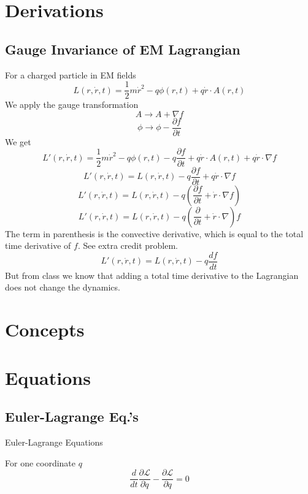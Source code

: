 \documentclass[25pt]{book}
\begin{document}
	\section{Derivations}
	
	\subsection{Gauge Invariance of EM Lagrangian}
	
	For a charged particle in EM fields
	\[
	L(r,\dot{r},t) = \frac{1}{2} m \dot{r}^2 - q \phi(r, t) + q \dot{r} \cdot A(r,t)
	\]
	We apply the gauge transformation 
	\[
	A \rightarrow A + \nabla f
	\]
	\[
	\phi \rightarrow \phi - \frac{\partial f}{\partial t}
	\]
	We get
	\[
	L'(r,\dot{r},t) = \frac{1}{2} m \dot{r}^2 - q \phi(r, t) - q \frac{\partial f}{\partial t} + q \dot{r} \cdot A(r,t) + q \dot{r} \cdot \nabla f
	\]
	\[
	L'(r,\dot{r},t) = L(r,\dot{r},t)  - q \frac{\partial f}{\partial t}  + q \dot{r} \cdot \nabla f
	\]
	\[
	L'(r,\dot{r},t) = L(r,\dot{r},t)  - q \left(  \frac{\partial f}{\partial t}  +  \dot{r} \cdot \nabla f \right)
	\]
	\[
	L'(r,\dot{r},t) = L(r,\dot{r},t)  - q \left(  \frac{\partial }{\partial t}  +  \dot{r} \cdot \nabla \right)f
	\]
	The term in parenthesis is the convective derivative, which is equal to the total time derivative of $f$. See extra credit problem.
	\[
	L'(r,\dot{r},t) = L(r,\dot{r},t)  - q \frac{df}{dt}
	\]
	But from class we know that adding a total time derivative to the Lagrangian does not change the dynamics. 

	
	\section{Concepts}
	
	\section{Equations}
	

	
	
	
	\subsection{Euler-Lagrange Eq.'s}
	
	Euler-Lagrange Equations
	
	For one coordinate $q$
	\[
	\frac{d}{dt} \frac{\partial \mathcal{L}}{\partial \dot{q}} - \frac{\partial \mathcal{L}}{\partial q}= 0
	\]
	
\end{document}

